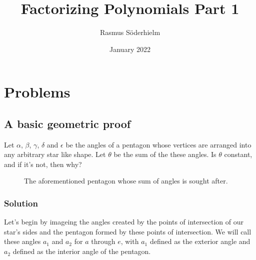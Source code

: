 \documentclass{article}
\title{Factorizing Polynomials Part 1}
\author{Rasmus Söderhielm}
\date{January 2022}
\newcommand{\solution}{\subsubsection*{\textcolor{MainColor}{Solution}}}
\theoremstyle{maintheorem}
\begin{document}
\linespread{1.5}\selectfont

\maketitle

\section*{\color{MainColor}Problems} \label{Problems}
\subsection{
    A basic geometric proof
}
Let $\alpha$, $\beta$, $\gamma$, $\delta$ and $\epsilon$ be the angles of a pentagon
whose vertices are arranged into any arbitrary star like shape.
Let $\theta$ be the sum of the these angles.
Is $\theta$ constant, and if it's not, then why?

\begin{figure}[h]\label{star}
    \centering

    \caption{The aforementioned pentagon whose sum of angles is sought after.}
\end{figure}

\solution

Let's begin by imageing the angles created by the points of intersection of our star's sides
and the pentagon formed by these points of intersection.
We will call these angles $a_1$ and $a_2$ for $a$ through $e$,
with $a_1$ defined as the exterior angle and $a_2$ defined as the interior angle of the pentagon.
\end{document}
